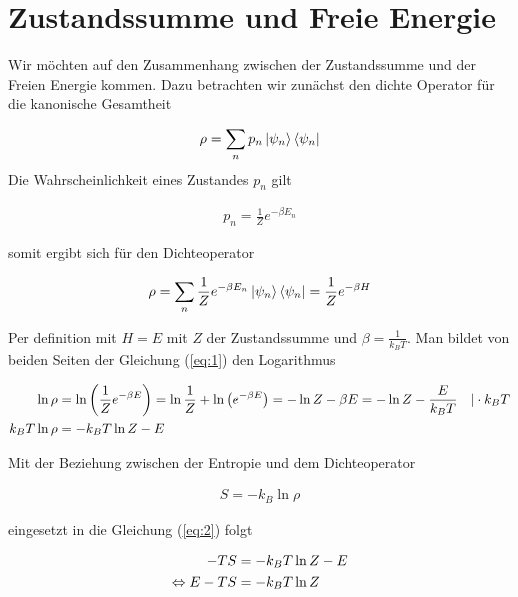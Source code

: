 
\usepackage{amsmath} 





\section*{Zustandssumme und Freie Energie}

Wir möchten auf den Zusammenhang zwischen der Zustandssumme und der Freien Energie kommen. Dazu betrachten wir zunächst den dichte Operator für die kanonische Gesamtheit


\begin{align}
  \label{eq:7}
  \rho = \sum_n p_n \left| \psi_n \right\rangle\left\langle \psi_n \right|
\end{align}
Die Wahrscheinlichkeit eines Zustandes \(p_n\) gilt

\begin{align}
  \label{eq:8}
  p_n = \frac{1}{Z}e^{-\beta E_n}
\end{align}

somit ergibt sich für den Dichteoperator

\begin{align}
  \label{eq:1}
  \rho = \sum_n \frac{1}{Z}e^{-\beta E_n} \left| \psi_n \right\rangle\left\langle \psi_n \right| = \frac{1}{Z}e^{-\beta H}
\end{align}

Per definition mit \(H=E\) mit \(Z\) der Zustandssumme und \(\beta=\frac{1}{k_B T}\). Man bildet von beiden Seiten der Gleichung (\ref{eq:1}) den Logarithmus

\begin{align}
  \label{eq:2}
  \ln \rho &= \ln\left( \frac{1}{Z}e^{-\beta E} \right) = \ln\frac{1}{Z} + \ln\left( e^{-\beta E}\right) = - \ln Z -\beta E =  - \ln Z - \frac{E}{k_B T} \quad | \cdot k_B T \notag \\
k_B T \ln \rho &=   - k_B T \ln Z - E
\end{align}

Mit der Beziehung zwischen der Entropie und dem Dichteoperator

\begin{align}
  \label{eq:3}
  S = -k_B \ln\rho
\end{align}

eingesetzt in die Gleichung (\ref{eq:2}) folgt

\begin{align}
  \label{eq:4}
  -TS &=  - k_B T \ln Z - E \notag \\
\Leftrightarrow E - TS &=  - k_B T \ln Z
\end{align}

